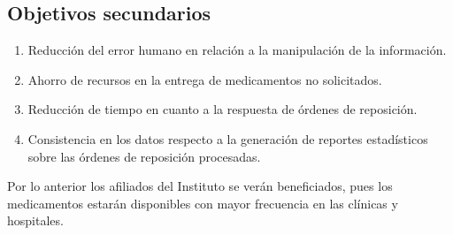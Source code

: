 \subsection{Objetivos secundarios}
\begin{enumerate}
\item Reducción del error humano en relación a la manipulación de la información.
\item Ahorro de recursos en la entrega de medicamentos no solicitados.
\item Reducción de tiempo en cuanto a la respuesta de órdenes de reposición.
\item Consistencia en los datos respecto a la generación de reportes estadísticos sobre las órdenes de reposición procesadas.
\end{enumerate}
Por lo anterior los afiliados del Instituto se verán beneficiados, pues los medicamentos estarán disponibles con mayor frecuencia en las clínicas y hospitales.


